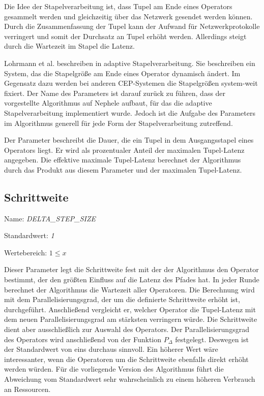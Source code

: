 Die Idee der Stapelverarbeitung ist, dass Tupel am Ende eines Operators gesammelt werden und gleichzeitig über das Netzwerk gesendet werden können.
Durch die Zusammenfassung der Tupel kann der Aufwand für Netzwerkprotokolle verringert und somit der Durchsatz an Tupel erhöht werden.
Allerdings steigt durch die Wartezeit im Stapel die Latenz.

Lohrmann et al. beschreiben in \cite{lohrmann_nephele_2014} adaptive Stapelverarbeitung.
Sie beschreiben ein System, das die Stapelgröße am Ende eines Operator dynamisch ändert.
Im Gegensatz dazu werden bei anderen CEP-Systemen die Stapelgrößen system-weit fixiert.
Der Name des Parameters ist darauf zurück zu führen, dass der vorgestellte Algorithmus auf Nephele aufbaut, für das die adaptive Stapelverarbeitung implementiert wurde.
Jedoch ist die Aufgabe des Parameters im Algorithmus generell für jede Form der Stapelverarbeitung zutreffend.

Der Parameter beschreibt die Dauer, die ein Tupel in dem Ausgangsstapel eines Operators liegt.
Er wird als prozentualer Anteil der maximalen Tupel-Latenz angegeben.
Die effektive maximale Tupel-Latenz berechnet der Algorithmus durch das Produkt aus diesem Parameter und der maximalen Tupel-Latenz.

\subsection{Schrittweite}

Name: \textit{DELTA\_STEP\_SIZE}

Standardwert: \textit{1}

Wertebereich: \textit{\(1 \leq x\)}

Dieser Parameter legt die Schrittweite fest mit der der Algorithmus den Operator bestimmt, der den größten Einfluss auf die Latenz des Pfades hat.
In jeder Runde berechnet der Algorithmus die Wartezeit aller Operatoren.
Die Berechnung wird mit dem Parallelisierungsgrad, der um die definierte Schrittweite erhöht ist, durchgeführt. 
Anschließend vergleicht er, welcher Operator die Tupel-Latenz mit dem neuen Parallelisierungsgrad am stärksten verringern würde.
Die Schrittweite dient aber ausschließlich zur Auswahl des Operators.
Der Parallelisierungsgrad des Operators wird anschließend von der Funktion \(P_\Delta\) festgelegt.
Deswegen ist der Standardwert von eins durchaus sinnvoll.
Ein höherer Wert wäre interessanter, wenn die Operatoren um die Schrittweite ebenfalls direkt erhöht werden würden.
Für die vorliegende Version des Algorithmus führt die Abweichung vom Standardwert sehr wahrscheinlich zu einem höheren Verbrauch an Ressourcen.

